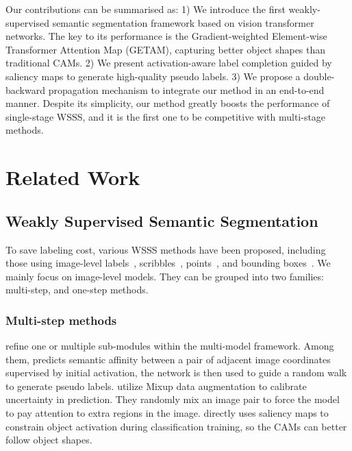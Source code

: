 \documentclass[10pt,twocolumn,letterpaper]{article}
\begin{document}
Our contributions can be summarised as:
1) We introduce the first weakly-supervised semantic segmentation framework based on vision transformer networks. The key to its performance is the Gradient-weighted Element-wise Transformer Attention Map (GETAM), capturing better object shapes than
traditional CAMs.
2) We present
activation-aware label completion guided by saliency maps to
generate high-quality pseudo labels. 
3) We propose a double-backward propagation mechanism to integrate our method in an end-to-end manner.
Despite its simplicity, our method greatly boosts the performance of single-stage WSSS, and it is the first one to be competitive with multi-stage methods.


\section{Related Work}
\subsection{Weakly Supervised Semantic Segmentation}
To save labeling cost,
various WSSS methods have been proposed,
including those using image-level labels~\cite{ahn2018learning,papandreou2015weakly,wang2020self,chang2020weakly,zhang2020reliability,yun2019cutmix,lee2021railroad}, scribbles~\cite{lin2016scribblesup}, points~\cite{bearman2016s}, and bounding boxes~\cite{dai2015boxsup,sun20203d,lee2021bbam,oh2021background}.
We mainly focus on image-level models. They
can be grouped into two families: multi-step, and
one-step
methods.
\subsubsection{Multi-step methods}
\cite{wang2020self,chang2020weakly,zhang2020splitting,zhang2020reliability,guo2019mixup,yun2019cutmix,kim2021discriminative,ahn2018learning,chang2020mixup,lee2021railroad} refine one or multiple sub-modules within the multi-model framework.
Among them, \cite{ahn2018learning} predicts semantic
affinity between a pair of adjacent image coordinates supervised by initial activation, the network is then used to guide a random walk to generate pseudo labels.
\cite{chang2020mixup,guo2019mixup} utilize Mixup data augmentation to calibrate uncertainty in prediction. They randomly mix an image pair 
to force the model to pay attention to extra regions in the image.
\cite{lee2021railroad} directly uses saliency maps to constrain object activation during classification training, so the CAMs can better follow object shapes.
\end{document}
